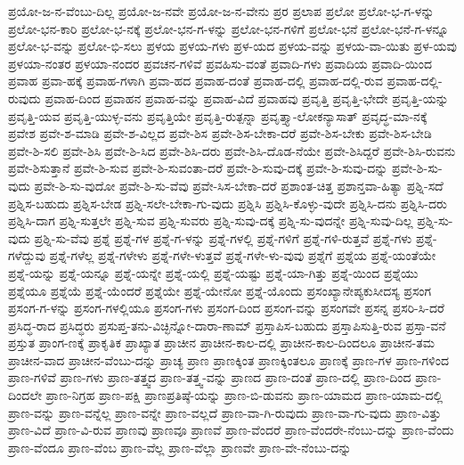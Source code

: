 {ಪ್ರಯೋ-ಜ-ನ-ವೆಂಬು-ದಿಲ್ಲ
ಪ್ರಯೋ-ಜ-ನವೇ
ಪ್ರಯೋ-ಜ-ನ-ವೇನು
ಪ್ರರ
ಪ್ರಲಾಪ
ಪ್ರಲೋ
ಪ್ರಲೋ-ಭ-ಗ-ಳನ್ನು
ಪ್ರಲೋ-ಭನ-ಕಾರಿ
ಪ್ರಲೋ-ಭ-ನಕ್ಕೆ
ಪ್ರಲೋ-ಭನ-ಗ-ಳನ್ನು
ಪ್ರಲೋ-ಭನ-ಗಳಿಗೆ
ಪ್ರಲೋ-ಭನೆ
ಪ್ರಲೋ-ಭನೆ-ಗ-ಳನ್ನೂ
ಪ್ರಲೋ-ಭ-ವನ್ನು
ಪ್ರಲೋ-ಭಿ-ಸಲು
ಪ್ರಳಯ
ಪ್ರಳಯ-ಗಳು
ಪ್ರಳ-ಯದ
ಪ್ರಳಯ-ವನ್ನು
ಪ್ರಳಯ-ವಾ-ಯಿತು
ಪ್ರಳ-ಯವು
ಪ್ರಳಯಾ-ನಂತರ
ಪ್ರಳಯಾ-ನಂದರ
ಪ್ರವಚನ-ಗಳಿವೆ
ಪ್ರವಹಿಸು-ವಂತೆ
ಪ್ರವಾದಿ-ಗಳು
ಪ್ರವಾದಿಯ
ಪ್ರವಾದಿ-ಯಿಂದ
ಪ್ರವಾಹ
ಪ್ರವಾ-ಹಕ್ಕೆ
ಪ್ರವಾಹ-ಗಳಾಗಿ
ಪ್ರವಾ-ಹದ
ಪ್ರವಾಹ-ದಂತೆ
ಪ್ರವಾಹ-ದಲ್ಲಿ
ಪ್ರವಾಹ-ದಲ್ಲಿ-ರುವ
ಪ್ರವಾಹ-ದಲ್ಲಿ-ರುವುದು
ಪ್ರವಾಹ-ದಿಂದ
ಪ್ರವಾಹನ
ಪ್ರವಾಹ-ವನ್ನು
ಪ್ರವಾಹ-ವಿದೆ
ಪ್ರವಾಹವು
ಪ್ರವೃತ್ತಿ
ಪ್ರವೃತ್ತಿ-ಭೇದೇ
ಪ್ರವೃತ್ತಿ-ಯನ್ನು
ಪ್ರವೃತ್ತಿ-ಯವ
ಪ್ರವೃತ್ತಿ-ಯುಳ್ಳ-ವನು
ಪ್ರವೃತ್ತಿಯೇ
ಪ್ರವೃತ್ತಿ-ರುತ್ಪನ್ನಾ
ಪ್ರವೃತ್ತ್ಯಾ-ಲೋಕನ್ಯಾಸಾತ್
ಪ್ರವೃದ್ಧ-ಮಾ-ನಕ್ಕೆ
ಪ್ರವೇಶ
ಪ್ರವೇ-ಶ-ಮಾಡಿ
ಪ್ರವೇ-ಶ-ವಿಲ್ಲದ
ಪ್ರವೇ-ಶಿಸ
ಪ್ರವೇ-ಶಿಸ-ಬೇಕಾ-ದರೆ
ಪ್ರವೇ-ಶಿಸ-ಬೇಕು
ಪ್ರವೇ-ಶಿಸ-ಬೇಡಿ
ಪ್ರವೇ-ಶಿ-ಸಲಿ
ಪ್ರವೇ-ಶಿಸಿ
ಪ್ರವೇ-ಶಿ-ಸಿದ
ಪ್ರವೇ-ಶಿಸಿ-ದರು
ಪ್ರವೇ-ಶಿಸಿ-ದೊಡ-ನೆಯೇ
ಪ್ರವೇ-ಶಿಸಿದ್ದರೆ
ಪ್ರವೇ-ಶಿಸಿ-ರುವನು
ಪ್ರವೇ-ಶಿಸುತ್ತಾನೆ
ಪ್ರವೇ-ಶಿ-ಸುವ
ಪ್ರವೇ-ಶಿ-ಸುವಂತಾ-ದರೆ
ಪ್ರವೇ-ಶಿ-ಸುವು-ದಕ್ಕೆ
ಪ್ರವೇ-ಶಿ-ಸುವು-ದನ್ನು
ಪ್ರವೇ-ಶಿ-ಸು-ವುದು
ಪ್ರವೇ-ಶಿ-ಸು-ವುದೋ
ಪ್ರವೇ-ಶಿ-ಸು-ವೆವು
ಪ್ರವೇ-ಸಿಸ-ಬೇಕಾ-ದರೆ
ಪ್ರಶಾಂತ-ಚಿತ್ತ
ಪ್ರಶಾನ್ತವಾ-ಹಿತ್ಯಾ
ಪ್ರಶ್ನಿ-ಸದೆ
ಪ್ರಶ್ನಿಸ-ಬಹುದು
ಪ್ರಶ್ನಿಸ-ಬೇಡ
ಪ್ರಶ್ನಿ-ಸಲೇ-ಬೇಕಾ-ಗು-ವುದು
ಪ್ರಶ್ನಿಸಿ
ಪ್ರಶ್ನಿಸಿ-ಕೊಳ್ಳು-ವುದೇ
ಪ್ರಶ್ನಿಸಿ-ದನು
ಪ್ರಶ್ನಿಸಿ-ದರು
ಪ್ರಶ್ನಿಸಿ-ದಾಗ
ಪ್ರಶ್ನಿ-ಸುತ್ತಲೇ
ಪ್ರಶ್ನಿ-ಸುವ
ಪ್ರಶ್ನಿ-ಸುವರು
ಪ್ರಶ್ನಿ-ಸುವು-ದಕ್ಕೆ
ಪ್ರಶ್ನಿ-ಸು-ವುದನ್ನೇ
ಪ್ರಶ್ನಿ-ಸುವು-ದಿಲ್ಲ
ಪ್ರಶ್ನಿ-ಸು-ವುದು
ಪ್ರಶ್ನಿ-ಸು-ವೆವು
ಪ್ರಶ್ನೆ
ಪ್ರಶ್ನೆ-ಗಳ
ಪ್ರಶ್ನೆ-ಗ-ಳನ್ನು
ಪ್ರಶ್ನೆ-ಗಳಲ್ಲಿ
ಪ್ರಶ್ನೆ-ಗಳಿಗೆ
ಪ್ರಶ್ನೆ-ಗಳಿ-ರುತ್ತವೆ
ಪ್ರಶ್ನೆ-ಗಳು
ಪ್ರಶ್ನೆ-ಗಳೆದ್ದುವು
ಪ್ರಶ್ನೆ-ಗಳೆಲ್ಲ
ಪ್ರಶ್ನೆ-ಗಳೇಳು
ಪ್ರಶ್ನೆ-ಗಳೇ-ಳುತ್ತವೆ
ಪ್ರಶ್ನೆ-ಗಳೇ-ಳು-ವುವು
ಪ್ರಶ್ನೆಗೆ
ಪ್ರಶ್ನೆಯ
ಪ್ರಶ್ನೆ-ಯಂತೆಯೇ
ಪ್ರಶ್ನೆ-ಯನ್ನು
ಪ್ರಶ್ನೆ-ಯನ್ನೂ
ಪ್ರಶ್ನೆ-ಯನ್ನೇ
ಪ್ರಶ್ನೆ-ಯಲ್ಲಿ
ಪ್ರಶ್ನೆ-ಯಷ್ಟು
ಪ್ರಶ್ನೆ-ಯಾ-ಗಿತ್ತು
ಪ್ರಶ್ನೆ-ಯಿಂದ
ಪ್ರಶ್ನೆಯು
ಪ್ರಶ್ನೆಯೂ
ಪ್ರಶ್ನೆಯೆ
ಪ್ರಶ್ನೆ-ಯೆಂದರೆ
ಪ್ರಶ್ನೆಯೇ
ಪ್ರಶ್ನೆ-ಯೇನೋ
ಪ್ರಶ್ನೆ-ಯೊಂದು
ಪ್ರಸಂಖ್ಯಾನೇಪ್ಯಕುಸೀದಸ್ಯ
ಪ್ರಸಂಗ
ಪ್ರಸಂಗ-ಗ-ಳನ್ನು
ಪ್ರಸಂಗ-ಗಳಲ್ಲಿಯೂ
ಪ್ರಸಂಗ-ಗಳು
ಪ್ರಸಂಗ-ದಿಂದ
ಪ್ರಸಂಗ-ವನ್ನು
ಪ್ರಸಂಗವೇ
ಪ್ರಸನ್ನ
ಪ್ರಸರಿ-ಸಿ-ದರೆ
ಪ್ರಸಿದ್ಧ-ರಾದ
ಪ್ರಸಿದ್ಧರು
ಪ್ರಸುಪ್ತ-ತನು-ವಿಚ್ಛಿನ್ನೋ-ದಾರಾ-ಣಾಮ್
ಪ್ರಸ್ತಾಪಿಸ-ಬಹುದು
ಪ್ರಸ್ತಾಪಿಸುತ್ತಿ-ರುವ
ಪ್ರಸ್ತಾ-ವನೆ
ಪ್ರಸ್ತುತ
ಪ್ರಾಂಗ-ಣಕ್ಕೆ
ಪ್ರಾಕೃತಿಕ
ಪ್ರಾಖ್ಯಾತ
ಪ್ರಾಚೀನ
ಪ್ರಾಚೀನ-ಕಾಲ-ದಲ್ಲಿ
ಪ್ರಾಚೀನ-ಕಾಲ-ದಿಂದಲೂ
ಪ್ರಾಚೀನ-ತಮ
ಪ್ರಾಚೀನ-ವಾದ
ಪ್ರಾಚೀನ-ವೆಂಬು-ದನ್ನು
ಪ್ರಾಚ್ಯ
ಪ್ರಾಣ
ಪ್ರಾಣಕ್ಕಿಂತ
ಪ್ರಾಣಕ್ಕಿಂತಲೂ
ಪ್ರಾಣಕ್ಕೆ
ಪ್ರಾಣ-ಗಳ
ಪ್ರಾಣ-ಗಳಿಂದ
ಪ್ರಾಣ-ಗಳಿವೆ
ಪ್ರಾಣ-ಗಳು
ಪ್ರಾಣ-ತತ್ತ್ವದ
ಪ್ರಾಣ-ತತ್ತ್ವ-ವನ್ನು
ಪ್ರಾಣದ
ಪ್ರಾಣ-ದಂತೆ
ಪ್ರಾಣ-ದಲ್ಲಿ
ಪ್ರಾಣ-ದಿಂದ
ಪ್ರಾಣ-ದಿಂದಲೇ
ಪ್ರಾಣ-ನಿಗ್ರಹ
ಪ್ರಾಣ-ಪಕ್ಷಿ
ಪ್ರಾಣಪ್ರತಿಷ್ಠೆ-ಯನ್ನು
ಪ್ರಾಣ-ಬಿ-ಡುವನು
ಪ್ರಾಣ-ಯಾಮದ
ಪ್ರಾಣ-ಯಾಮ-ದಲ್ಲಿ
ಪ್ರಾಣ-ವನ್ನು
ಪ್ರಾಣ-ವನ್ನೆಲ್ಲ
ಪ್ರಾಣ-ವನ್ನೇ
ಪ್ರಾಣ-ವಲ್ಲದೆ
ಪ್ರಾಣ-ವಾ-ಗಿ-ರುವುದು
ಪ್ರಾಣ-ವಾ-ಗು-ವುದು
ಪ್ರಾಣ-ವಿತ್ತು
ಪ್ರಾಣ-ವಿದೆ
ಪ್ರಾಣ-ವಿ-ರುವ
ಪ್ರಾಣವು
ಪ್ರಾಣವೂ
ಪ್ರಾಣವೆ
ಪ್ರಾಣ-ವೆಂದರೆ
ಪ್ರಾಣ-ವೆಂದರೇ-ನೆಂಬು-ದನ್ನು
ಪ್ರಾಣ-ವೆಂದು
ಪ್ರಾಣ-ವೆಂದೂ
ಪ್ರಾಣ-ವೆಂಬ
ಪ್ರಾಣ-ವೆಲ್ಲ
ಪ್ರಾಣ-ವೆಲ್ಲಾ
ಪ್ರಾಣವೇ
ಪ್ರಾಣ-ವೇ-ನೆಂಬು-ದನ್ನು
}
